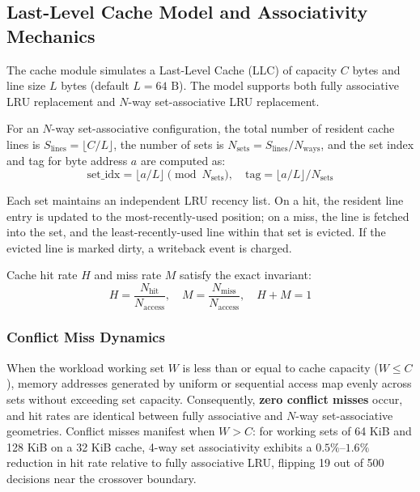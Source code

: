 \documentclass[journal,10pt,twocolumn]{IEEEtran}
\begin{document}
\subsection{Last-Level Cache Model and Associativity Mechanics}
The cache module simulates a Last-Level Cache (LLC) of capacity $C$ bytes and line size $L$ bytes (default $L = 64\text{ B}$). The model supports both fully associative LRU replacement and $N$-way set-associative LRU replacement.

For an $N$-way set-associative configuration, the total number of resident cache lines is $S_{\text{lines}} = \lfloor C / L \rfloor$, the number of sets is $N_{\text{sets}} = S_{\text{lines}} / N_{\text{ways}}$, and the set index and tag for byte address $a$ are computed as:
\begin{equation}
\text{set\_idx} = \lfloor a / L \rfloor \pmod{N_{\text{sets}}}, \quad \text{tag} = \lfloor a / L \rfloor / N_{\text{sets}}
\end{equation}

Each set maintains an independent LRU recency list. On a hit, the resident line entry is updated to the most-recently-used position; on a miss, the line is fetched into the set, and the least-recently-used line within that set is evicted. If the evicted line is marked dirty, a writeback event is charged.

Cache hit rate $H$ and miss rate $M$ satisfy the exact invariant:
\begin{equation}
H = \frac{N_{\text{hit}}}{N_{\text{access}}}, \quad M = \frac{N_{\text{miss}}}{N_{\text{access}}}, \quad H + M = 1
\end{equation}

\subsubsection{Conflict Miss Dynamics}
When the workload working set $W$ is less than or equal to cache capacity ($W \le C$), memory addresses generated by uniform or sequential access map evenly across sets without exceeding set capacity. Consequently, \textbf{zero conflict misses} occur, and hit rates are identical between fully associative and $N$-way set-associative geometries. Conflict misses manifest when $W > C$: for working sets of 64 KiB and 128 KiB on a 32 KiB cache, 4-way set associativity exhibits a $0.5\%$--$1.6\%$ reduction in hit rate relative to fully associative LRU, flipping 19 out of 500 decisions near the crossover boundary.
\end{document}
